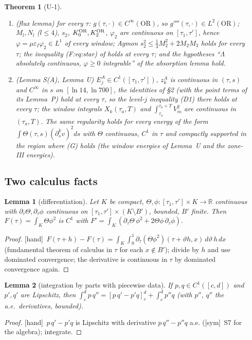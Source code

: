 \documentclass[11pt]{article}
\newtheorem{lemma}{Lemma}\newtheorem{proposition}{Proposition}\newtheorem{remark}{Remark}\newtheorem{theorem}{Theorem}\newtheorem{definition}{Definition}
\newcommand{\fn}[1]{\texttt{\detokenize{#1}}}
\newcommand{\tH}{\textup{[hand]}}\newcommand{\tS}{\textup{[sym]}}\newcommand{\tR}{\textup{[read]}}\newcommand{\tL}{\textup{[Lean]}}\newcommand{\tD}{\textup{[DKS]}}\newcommand{\tI}{\textup{[inh]}}
\begin{document}
\begin{theorem}[U-1]
\begin{enumerate}[label=(\alph*),leftmargin=2em]
\item \emph{(flux lemma)} for every $\tau$: $g(\tau,\cdot)\in C^\infty(\mathrm{OR})$, so $g''''(\tau,\cdot)\in L^2(\mathrm{OR})$; $M_l,N_l$ ($l\le4$), $s_2$, $K^{\rm OR}_0,K^{\rm OR}_2$, $\varphi_2$ are continuous on $[\tau_1,\tau']$, hence $\varphi=\mu\varepsilon_I\varphi_2\in L^1$ of every window; Agmon $s_2^2\le\frac13M_2^2+2M_2M_3$ holds for every $\tau$; the inequality (F:eq:star) of \fn{flux2_lemma_v40.tex} holds at every $\tau$; and the hypotheses ``$\Lambda$ absolutely continuous, $\varphi\ge0$ integrable'' of the absorption lemma hold.
\item \emph{(Lemma S(A), Lemma U)} $E^A_j\in C^1([\tau_1,\tau'])$, $z^A_k$ is continuous in $(\tau,s)$ and $C^\infty$ in $s$ on $[\ln14,\ln700]$, the identities of \fn{lemmaS_A_v33.tex} \S2 (with the point terms of its Lemma~P) hold at every $\tau$, so the level-$j$ inequality (D1) there holds at every $\tau$; the window integrals $X_k(\tau_a,T)$ and $\int_{\tau_a}^{\tau_a+T}V_m^2$ are continuous in $(\tau_a,T)$. The same regularity holds for every energy of the form $\int\Theta(\tau,s)(\partial_s^kv)^2ds$ with $\Theta$ continuous, $C^1$ in $\tau$ and compactly supported in the region where (G) holds (the window energies of Lemma~U and the zone-III energies).
\end{enumerate}
\end{theorem}

\subsection{Two calculus facts}
\begin{lemma}[differentiation]\label{U:lem:leib}
Let $K$ be compact, $\Theta,\phi:[\tau_1,\tau']\times K\to\mathbb R$ continuous with $\partial_\tau\Theta,\partial_\tau\phi$ continuous on $[\tau_1,\tau']\times(K\setminus B')$, bounded, $B'$ finite. Then $F(\tau)=\int_K\Theta\phi^2$ is $C^1$ with $F'=\int_K(\partial_\tau\Theta\,\phi^2+2\Theta\phi\,\partial_\tau\phi)$.
\end{lemma}
\begin{proof}\tH\ $F(\tau+h)-F(\tau)=\int_K\int_0^1\partial_\tau(\Theta\phi^2)(\tau+\vartheta h,x)\,d\vartheta\,h\,dx$ (fundamental theorem of calculus in $\tau$ for each $x\notin B'$); divide by $h$ and use dominated convergence; the derivative is continuous in $\tau$ by dominated convergence again.
\end{proof}
\begin{lemma}[integration by parts with piecewise data]\label{U:lem:ibp}
If $p,q\in C^1([c,d])$ and $p',q'$ are Lipschitz, then $\int_c^dp\,q''=[p\,q'-p'q]_c^d+\int_c^dp''q$ (with $p''$, $q''$ the a.e.\ derivatives, bounded).
\end{lemma}
\begin{proof}\tH\ $p\,q'-p'q$ is Lipschitz with derivative $p\,q''-p''q$ a.e. (\tS\ S7 for the algebra); integrate.
\end{proof}
\end{document}
